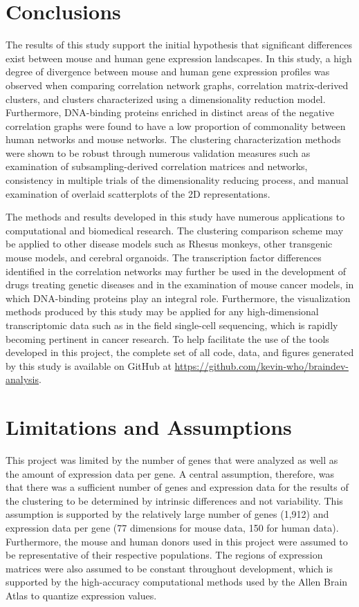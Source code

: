\documentclass[12pt,oneside,onecolumn,a4paper]{article}
\begin{document}
\section{Conclusions}

The results of this study support the initial hypothesis that significant differences exist between mouse and human gene expression landscapes. In this study, a high degree of divergence between mouse and human gene expression profiles was observed when comparing correlation network graphs, correlation matrix-derived clusters, and clusters characterized using a dimensionality reduction model. Furthermore, DNA-binding proteins enriched in distinct areas of the negative correlation graphs were found to have a low proportion of commonality between human networks and mouse networks. The clustering characterization methods were shown to be robust through numerous validation measures such as examination of subsampling-derived correlation matrices and networks, consistency in multiple trials of the dimensionality reducing process, and manual examination of overlaid scatterplots of the 2D representations. 

The methods and results developed in this study have numerous applications to computational and biomedical research. The clustering comparison scheme may be applied to other disease models such as Rhesus monkeys, other transgenic mouse models, and cerebral organoids. The transcription factor differences identified in the correlation networks may further be used in the development of drugs treating genetic diseases and in the examination of mouse cancer models, in which DNA-binding proteins play an integral role. Furthermore, the visualization methods produced by this study may be applied for any high-dimensional transcriptomic data such as in the field single-cell sequencing, which is rapidly becoming pertinent in cancer research. To help facilitate the use of the tools developed in this project, the complete set of all code, data, and figures generated by this study is available on GitHub at \url{https://github.com/kevin-who/braindev-analysis}.




\appendix

\section{Limitations and Assumptions}

This project was limited by the number of genes that were analyzed as well as the amount of expression data per gene. A central assumption, therefore, was that there was a sufficient number of genes and expression data for the results of the clustering to be determined by intrinsic differences and not variability. This assumption is supported by the relatively large number of genes (1,912) and expression data per gene (77 dimensions for mouse data, 150 for human data). Furthermore, the mouse and human donors used in this project were assumed to be representative of their respective populations. The regions of expression matrices were also assumed to be constant throughout development, which is supported by the high-accuracy computational methods used by the Allen Brain Atlas to quantize expression values.
\end{document}

